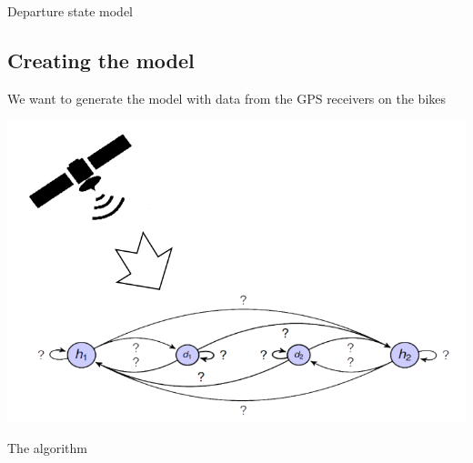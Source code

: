 \begin{frame}{Departure state model}

\end{frame}

\subsection{Creating the model}

\begin{frame}{}
	
\begin{center}
We want to generate the model with data from the GPS receivers on the bikes
	
\includegraphics[width=0.8\linewidth]{graphics/build_the_model}
\end{center}

\end{frame}

\begin{frame}{The algorithm}

\end{frame}